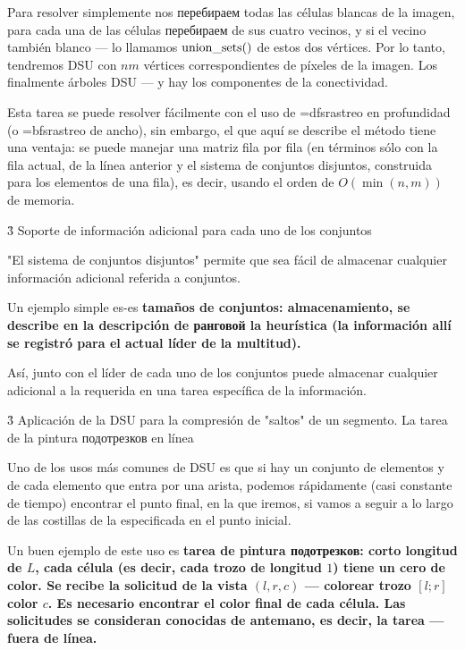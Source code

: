 Para resolver simplemente nos перебираем todas las células blancas de la imagen, para cada una de las células перебираем de sus cuatro vecinos, y si el vecino también blanco --- lo llamamos ${\rm union\_sets}()$ de estos dos vértices. Por lo tanto, tendremos DSU con $nm$ vértices correspondientes de píxeles de la imagen. Los finalmente árboles DSU --- y hay los componentes de la conectividad.

Esta tarea se puede resolver fácilmente con el uso de \algohref=dfs{rastreo en profundidad} (o \algohref=bfs{rastreo de ancho}), sin embargo, el que aquí se describe el método tiene una ventaja: se puede manejar una matriz fila por fila (en términos sólo con la fila actual, de la línea anterior y el sistema de conjuntos disjuntos, construida para los elementos de una fila), es decir, usando el orden de $O(\min (n, m))$ de memoria.



\h3{ Soporte de información adicional para cada uno de los conjuntos }

"El sistema de conjuntos disjuntos" permite que sea fácil de almacenar cualquier información adicional referida a conjuntos.

Un ejemplo simple es-es \bf{tamaños de conjuntos}: almacenamiento, se describe en la descripción de ранговой la heurística (la información allí se registró para el actual líder de la multitud).

Así, junto con el líder de cada uno de los conjuntos puede almacenar cualquier adicional a la requerida en una tarea específica de la información.



\h3{ Aplicación de la DSU para la compresión de "saltos" de un segmento. La tarea de la pintura подотрезков en línea }

Uno de los usos más comunes de DSU es que si hay un conjunto de elementos y de cada elemento que entra por una arista, podemos rápidamente (casi constante de tiempo) encontrar el punto final, en la que iremos, si vamos a seguir a lo largo de las costillas de la especificada en el punto inicial.

Un buen ejemplo de este uso es \bf{tarea de pintura подотрезков}: corto longitud de $L$, cada célula (es decir, cada trozo de longitud $1$) tiene un cero de color. Se recibe la solicitud de la vista $(l,r,c)$ --- colorear trozo $[l;r]$ color $c$. Es necesario encontrar el color final de cada célula. Las solicitudes se consideran conocidas de antemano, es decir, la tarea --- fuera de línea.

